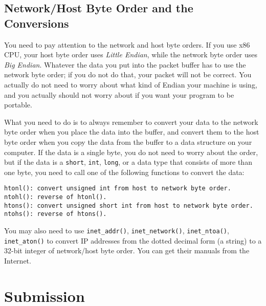 \subsection{Network/Host Byte Order and the Conversions}


You need to pay attention to the network and host byte orders. If you use 
x86 CPU, your host byte order uses {\em Little Endian}, while 
the network byte order uses {\em Big Endian}. Whatever the data you put 
into the packet buffer has to use the network byte order; if you do not 
do that, your packet will not be correct. You actually do not need to worry
about what kind of Endian your machine is using, and you actually should not worry
about if you want your program to be portable. 


What you need to do is to always remember to convert your data to the
network byte order when you place the data into the buffer, and convert
them to the host byte order when you copy the data from the buffer to 
a data structure on your computer. If the data is a single byte, you do not
need to worry about the order, but if the data is a {\tt short}, 
{\tt int}, {\tt long}, or a data type that consists of more than one byte, 
you need to call one of the following functions to convert the data:

\begin{lstlisting}
htonl(): convert unsigned int from host to network byte order.
ntohl(): reverse of htonl().
htons(): convert unsigned short int from host to network byte order.
ntohs(): reverse of htons().
\end{lstlisting}


You may also need to use {\tt inet\_addr()}, {\tt inet\_network()},
{\tt inet\_ntoa()}, {\tt inet\_aton()} to convert 
IP addresses from the dotted decimal form (a string) to a
32-bit integer of network/host byte order. You can get their 
manuals from the Internet.


 

\section{Submission}

\seedsubmission 






